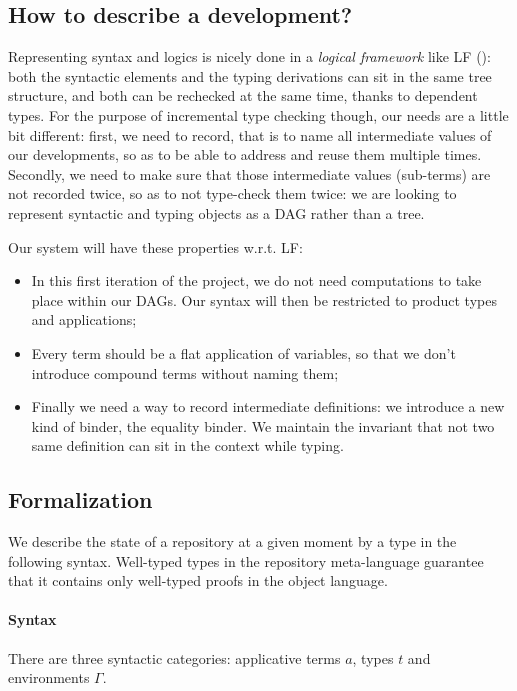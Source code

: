 \documentclass{article}
\begin{document}
\subsection{How to describe a development?}

Representing syntax and logics is nicely done in a \emph{logical
  framework} like LF (\cite{harper1993framework}): both the syntactic
elements and the typing derivations can sit in the same tree
structure, and both can be rechecked at the same time, thanks to
dependent types. For the purpose of incremental type checking though,
our needs are a little bit different: first, we need to record, that
is to name all intermediate values of our developments, so as to be
able to address and reuse them multiple times. Secondly, we need to
make sure that those intermediate values (sub-terms) are not recorded
twice, so as to not type-check them twice: we are looking to represent
syntactic and typing objects as a DAG rather than a tree.

Our system will have these properties w.r.t. LF:
\begin{itemize}
\item In this first iteration of the project, we do not need
  computations to take place within our DAGs. Our syntax will then be
  restricted to product types and applications;
\item Every term should be a flat application of variables, so that we
  don't introduce compound terms without naming them;
\item Finally we need a way to record intermediate definitions: we
  introduce a new kind of binder, the equality binder. We maintain the
  invariant that not two same definition can sit in the context while
  typing.
\end{itemize}

\subsection{Formalization}

We describe the state of a repository at a given moment by a type in
the following syntax. Well-typed types in the repository meta-language
guarantee that it contains only well-typed proofs in the object
language.

\paragraph{Syntax} There are three syntactic categories: applicative
terms $a$, types $t$ and environments $\Gamma$.
\end{document}
